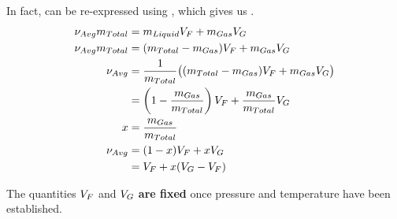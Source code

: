 In fact,  can be re-expressed using , which gives us .
\begin{align*}
  \nu_{Avg} m_{Total} &= m_{Liquid} V_{F} + m_{Gas} V_{G} \\
  \nu_{Avg} m_{Total} &= (m_{Total} - m_{Gas}) V_{F} + m_{Gas} V_{G} \\
  \nu_{Avg} &= \frac{1}{m_{Total}} \bigl( (m_{Total} - m_{Gas}) V_{F} + m_{Gas} V_{G} \bigr) \\
                                &= \left( 1 - \frac{m_{Gas}}{m_{Total}} \right) V_{F} + \frac{m_{Gas}}{m_{Total}} V_{G} \\
  x &= \frac{m_{Gas}}{m_{Total}} \\
  \nu_{Avg} &= (1 - x) V_{F} + x V_{G} \\
  &= V_{F} + x (V_{G} - V_{F})
\end{align*}

The quantities $V_{F}$ and $V_{G}$ \textbf{are fixed} once pressure and temperature have been established.


